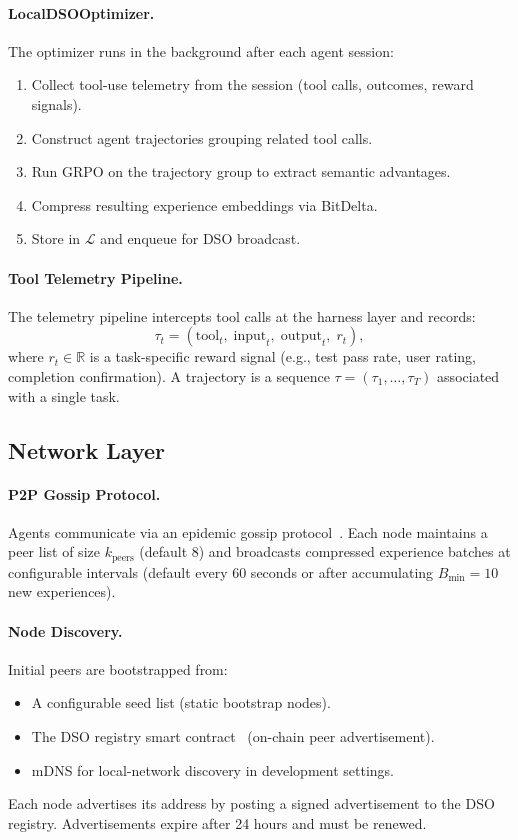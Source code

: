 \documentclass[11pt]{article}
\begin{document}
\paragraph{LocalDSOOptimizer.}
The optimizer runs in the background after each agent session:
\begin{enumerate}[leftmargin=1.5em]
    \item Collect tool-use telemetry from the session (tool calls, outcomes,
          reward signals).
    \item Construct agent trajectories grouping related tool calls.
    \item Run GRPO on the trajectory group to extract semantic advantages.
    \item Compress resulting experience embeddings via BitDelta.
    \item Store in $\mathcal{L}$ and enqueue for DSO broadcast.
\end{enumerate}

\paragraph{Tool Telemetry Pipeline.}
The telemetry pipeline intercepts tool calls at the harness layer and records:
\begin{equation}
    \tau_t = \left(\text{tool}_t, \; \text{input}_t, \; \text{output}_t, \; r_t\right),
\end{equation}
where $r_t \in \mathbb{R}$ is a task-specific reward signal (e.g., test pass
rate, user rating, completion confirmation). A trajectory is a sequence
$\tau = (\tau_1, \ldots, \tau_T)$ associated with a single task.

\subsection{Network Layer}

\paragraph{P2P Gossip Protocol.}
Agents communicate via an epidemic gossip protocol~\cite{demers1987epidemic}.
Each node maintains a peer list of size $k_{\text{peers}}$ (default 8) and
broadcasts compressed experience batches at configurable intervals
(default every 60 seconds or after accumulating $B_{\min} = 10$ new experiences).

\paragraph{Node Discovery.}
Initial peers are bootstrapped from:
\begin{itemize}[leftmargin=1.5em]
    \item A configurable seed list (static bootstrap nodes).
    \item The DSO registry smart contract~\cite{hanzo2026dso} (on-chain
          peer advertisement).
    \item mDNS for local-network discovery in development settings.
\end{itemize}
Each node advertises its address by posting a signed advertisement to the
DSO registry. Advertisements expire after 24 hours and must be renewed.
\end{document}
